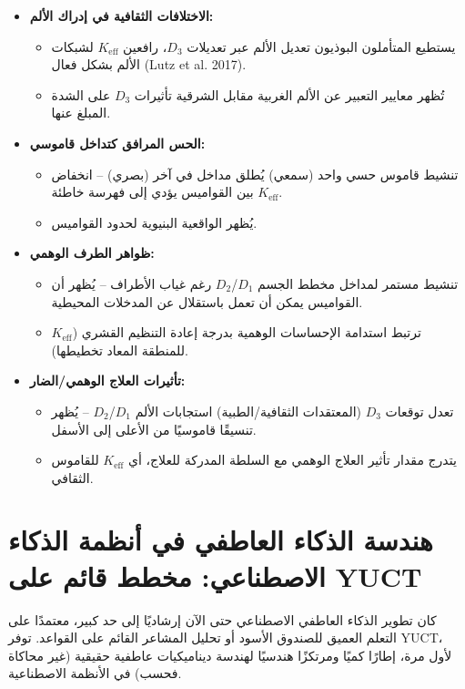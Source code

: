 \documentclass[12pt,a4paper]{article}
\newcommand{\eff}{\mathrm{eff}}
\newcommand{\Ke}{K_{\eff}}
\begin{document}
	\begin{itemize}
		\item \textbf{الاختلافات الثقافية في إدراك الألم:}
		\begin{itemize}
			\item يستطيع المتأملون البوذيون تعديل الألم عبر تعديلات \(D_3\)، رافعين \(\Ke\) لشبكات الألم بشكل فعال (Lutz et al. 2017).
			\item تُظهر معايير التعبير عن الألم الغربية مقابل الشرقية تأثيرات \(D_3\) على الشدة المبلغ عنها.
		\end{itemize}
		
		\item \textbf{الحس المرافق كتداخل قاموسي:}
		\begin{itemize}
			\item تنشيط قاموس حسي واحد (سمعي) يُطلق مداخل في آخر (بصري) – انخفاض \(\Ke\) بين القواميس يؤدي إلى فهرسة خاطئة.
			\item يُظهر الواقعية البنيوية لحدود القواميس.
		\end{itemize}
		
		\item \textbf{ظواهر الطرف الوهمي:}
		\begin{itemize}
			\item تنشيط مستمر لمداخل مخطط الجسم \(D_1\)/\(D_2\) رغم غياب الأطراف – يُظهر أن القواميس يمكن أن تعمل باستقلال عن المدخلات المحيطية.
			\item ترتبط استدامة الإحساسات الوهمية بدرجة إعادة التنظيم القشري (\(\Ke\) للمنطقة المعاد تخطيطها).
		\end{itemize}
		
		\item \textbf{تأثيرات العلاج الوهمي/الضار:}
		\begin{itemize}
			\item تعدل توقعات \(D_3\) (المعتقدات الثقافية/الطبية) استجابات الألم \(D_1\)/\(D_2\) – يُظهر تنسيقًا قاموسيًا من الأعلى إلى الأسفل.
			\item يتدرج مقدار تأثير العلاج الوهمي مع السلطة المدركة للعلاج، أي \(\Ke\) للقاموس الثقافي.
		\end{itemize}
	\end{itemize}
	
	\section{هندسة الذكاء العاطفي في أنظمة الذكاء الاصطناعي: مخطط قائم على YUCT}
	
	كان تطوير الذكاء العاطفي الاصطناعي حتى الآن إرشاديًا إلى حد كبير، معتمدًا على التعلم العميق للصندوق الأسود أو تحليل المشاعر القائم على القواعد. توفر YUCT، لأول مرة، إطارًا كميًا ومرتكزًا هندسيًا لهندسة ديناميكيات عاطفية حقيقية (غير محاكاة فحسب) في الأنظمة الاصطناعية.
	
\end{document}
